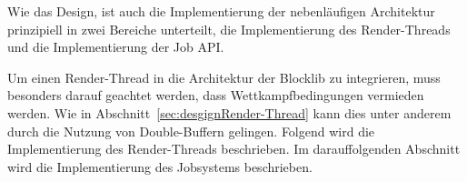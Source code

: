 Wie das Design, ist auch die Implementierung der nebenläufigen Architektur prinzipiell in zwei Bereiche unterteilt, die Implementierung des Render-Threads und die Implementierung der Job API.

Um einen Render-Thread in die Architektur der Blocklib zu integrieren, muss besonders darauf geachtet werden, dass Wettkampfbedingungen vermieden werden. Wie in Abschnitt~\ref{sec:desgignRender-Thread} kann dies unter anderem durch die Nutzung von Double-Buffern gelingen. Folgend wird die Implementierung des Render-Threads beschrieben. Im darauffolgenden Abschnitt wird die Implementierung des Jobsystems beschrieben.